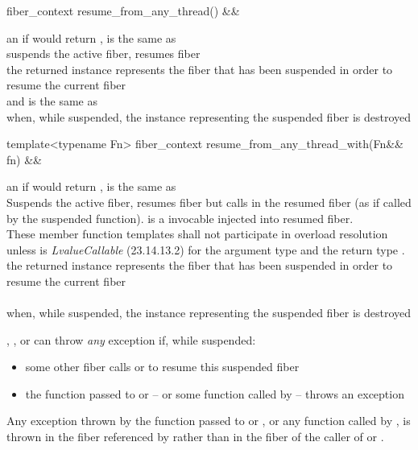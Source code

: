 %
\begin{itemdecl}
fiber_context resume_from_any_thread() &&
\end{itemdecl}

\begin{itemdescr}
\pnum
\preconditions {} an if \canxtresume would return ,
\currthread is the same as \lastthread\\
\effects suspends the active fiber, resumes fiber \\
\returns the returned instance represents the fiber that has been suspended in
order to resume the current fiber\\
\postcondition {} and \currthread is the same as \lastthread\\
\throws \unwindex when, while suspended, the \fiber instance representing the
suspended fiber is destroyed
\end{itemdescr}

%
\begin{itemdecl}
template<typename Fn>
fiber_context resume_from_any_thread_with(Fn&& fn) &&
\end{itemdecl}

\begin{itemdescr}
\pnum
\preconditions {} an if \canxtresume would return ,
\currthread is the same as \lastthread\\
\effects Suspends the active fiber, resumes fiber  but calls
 in the resumed fiber (as if called by the suspended function).
 is a invocable injected into resumed fiber.\\
These member function templates shall not participate in overload resolution
unless  is \emph{LvalueCallable} (23.14.13.2) for the argument type
 and the return type \fiber.\\
\returns the returned instance represents the fiber that has been suspended in
order to resume the current fiber\\
\postcondition {}\\
\throws \unwindex when, while suspended, the \fiber instance representing the
suspended fiber is destroyed
\end{itemdescr}

\resume, \resumewith, \xtresume or \xtresumewith can throw \emph{any} exception
if, while suspended:
\begin{itemize}
    \item some other fiber calls \resumewith or \xtresumewith to resume this
        suspended fiber
    \item the function  passed to \resumewith or \xtresumewith -- or
        some function called by  -- throws an exception
\end{itemize}
Any exception thrown by the function  passed to \resumewith or
\xtresumewith, or any function called by , is thrown in the fiber
referenced by  rather than in the fiber of the caller of
\resumewith or \xtresumewith.

